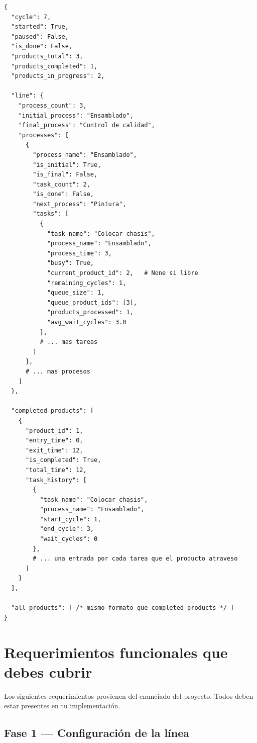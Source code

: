 \documentclass[12pt,letterpaper]{article}
\begin{document}
\begin{lstlisting}
{
  "cycle": 7,
  "started": True,
  "paused": False,
  "is_done": False,
  "products_total": 3,
  "products_completed": 1,
  "products_in_progress": 2,

  "line": {
    "process_count": 3,
    "initial_process": "Ensamblado",
    "final_process": "Control de calidad",
    "processes": [
      {
        "process_name": "Ensamblado",
        "is_initial": True,
        "is_final": False,
        "task_count": 2,
        "is_done": False,
        "next_process": "Pintura",
        "tasks": [
          {
            "task_name": "Colocar chasis",
            "process_name": "Ensamblado",
            "process_time": 3,
            "busy": True,
            "current_product_id": 2,   # None si libre
            "remaining_cycles": 1,
            "queue_size": 1,
            "queue_product_ids": [3],
            "products_processed": 1,
            "avg_wait_cycles": 3.0
          },
          # ... mas tareas
        ]
      },
      # ... mas procesos
    ]
  },

  "completed_products": [
    {
      "product_id": 1,
      "entry_time": 0,
      "exit_time": 12,
      "is_completed": True,
      "total_time": 12,
      "task_history": [
        {
          "task_name": "Colocar chasis",
          "process_name": "Ensamblado",
          "start_cycle": 1,
          "end_cycle": 3,
          "wait_cycles": 0
        },
        # ... una entrada por cada tarea que el producto atraveso
      ]
    }
  ],

  "all_products": [ /* mismo formato que completed_products */ ]
}
\end{lstlisting}

\section{Requerimientos funcionales que debes cubrir}

Los siguientes requerimientos provienen del enunciado del proyecto. Todos deben
estar presentes en tu implementación.

\subsection{Fase 1 — Configuración de la línea}
\end{document}
